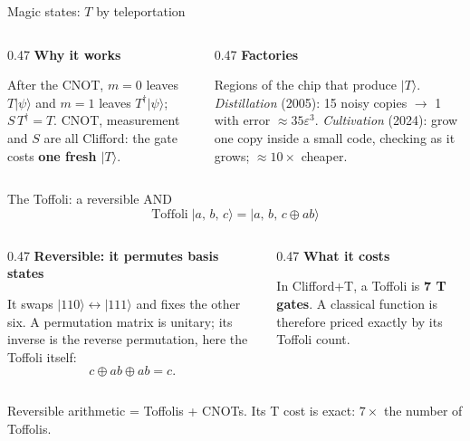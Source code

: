 \documentclass[aspectratio=169,11pt]{beamer}
\newcommand{\blocktitle}[1]{{\bfseries #1}\par\vskip1mm}
\newcommand{\oplusat}[2]{\draw[thick,color=body] (#1,#2) circle (1.6mm);
  \draw[thick,color=body] (#1-0.16,#2) -- (#1+0.16,#2); \draw[thick,color=body] (#1,#2-0.16) -- (#1,#2+0.16);}
\begin{document}
\setcounter{framenumber}{11}
\begin{frame}{Magic states: $T$ by teleportation}
  \centering
  \vskip3mm
  \begin{columns}[T]
    \begin{column}{0.47\textwidth}
      \blocktitle{Why it works}
      After the CNOT, $m=0$ leaves $T|\psi\rangle$ and $m=1$ leaves $T^\dagger|\psi\rangle$; $S\,T^\dagger=T$. CNOT, measurement and $S$ are all Clifford: the gate costs \textbf{one fresh $|T\rangle$}.
    \end{column}
    \begin{column}{0.47\textwidth}
      \blocktitle{Factories}
      Regions of the chip that produce $|T\rangle$. \emph{Distillation} (2005): 15 noisy copies $\to$ 1 with error $\approx35\varepsilon^3$. \emph{Cultivation} (2024): grow one copy inside a small code, checking as it grows; $\approx10\times$ cheaper.
    \end{column}
  \end{columns}
\end{frame}

\setcounter{framenumber}{12}
\begin{frame}{The Toffoli: a reversible AND}
  \[ \mathrm{Toffoli}\;|a,\,b,\,c\rangle = |a,\,b,\,c\oplus ab\rangle \]
  \vskip1mm
  \begin{columns}[T]
    \begin{column}{0.47\textwidth}
      \blocktitle{Reversible: it permutes basis states}
      It swaps $|110\rangle\leftrightarrow|111\rangle$ and fixes the other six. A permutation matrix is unitary; its inverse is the reverse permutation, here the Toffoli itself:
      \[ c\oplus ab\oplus ab=c . \]
    \end{column}
    \begin{column}{0.47\textwidth}
      \blocktitle{What it costs}
      In Clifford+T, a Toffoli is \textbf{7 T gates}. A classical function is therefore priced exactly by its Toffoli count.
    \end{column}
  \end{columns}
  \begin{takeaway}Reversible arithmetic = Toffolis + CNOTs. Its T cost is exact: $7\times$ the number of Toffolis.\end{takeaway}
\end{frame}
\end{document}
